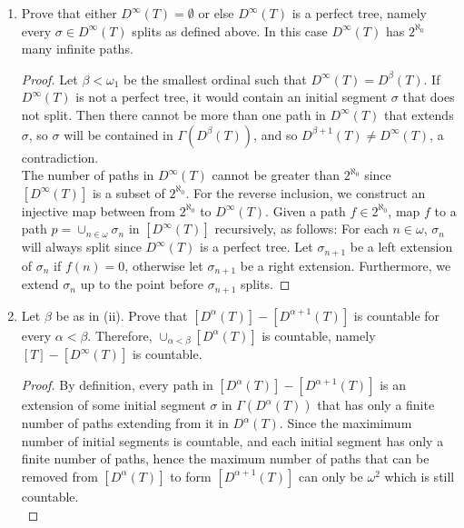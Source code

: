 \documentclass{article}
\begin{document}
\begin{enumerate}[label={\bf Q\arabic*:}]
\begin{enumerate}[label={(\roman*)}]
      \item Prove that either $D^\infty(T)=\emptyset$ or else $D^\infty(T)$
        is a perfect tree, namely every $\sigma\in D^\infty(T)$ splits as
        defined above. In this case $D^\infty(T)$ has $2^{\aleph_0}$ many
        infinite paths.

        \begin{proof}
          Let $\beta<\omega_1$ be the smallest ordinal such that
          $D^\infty(T)=D^\beta(T)$. If $D^\infty(T)$ is not a perfect tree,
          it would contain an initial segment $\sigma$ that does not split.
          Then there cannot be more than one path in $D^\infty(T)$ that
          extends $\sigma$, so $\sigma$ will be contained in
          $\Gamma(D^\beta(T))$, and so $D^{\beta+1}(T)\neq
          D^\infty(T)$, a contradiction. \\

          The number of paths in $D^\infty(T)$ cannot be greater than
          $2^{\aleph_0}$ since $[D^\infty(T)]$ is a subset of
          $2^{\aleph_0}$. For the reverse inclusion, we construct an
          injective map between from $2^{\aleph_0}$ to $D^\infty(T)$. Given
          a path $f\in2^{\aleph_0}$, map $f$ to a path
          $p=\cup_{n\in\omega}\sigma_n$ in $[D^\infty(T)]$ recursively, as
          follows: For each $n\in\omega$, $\sigma_n$ will always split
          since $D^\infty(T)$ is a perfect tree. Let $\sigma_{n+1}$ be a
          left extension of $\sigma_{n}$ if $f(n)=0$, otherwise let
          $\sigma_{n+1}$ be a right extension. Furthermore, we extend
          $\sigma_n$ up to the point before $\sigma_{n+1}$ splits.
        \end{proof}

      \item Let $\beta$ be as in (ii). Prove that
        $[D^\alpha(T)]-[D^{\alpha+1}(T)]$ is countable for every
        $\alpha<\beta$. Therefore, $\cup_{\alpha<\beta}[D^\alpha(T)]$ is
        countable, namely $[T]-[D^\infty(T)]$ is countable.

        \begin{proof}
          By definition, every path in $[D^\alpha(T)]-[D^{\alpha+1}(T)]$ is
          an extension of some initial segment $\sigma$ in
          $\Gamma(D^\alpha(T))$ that has only a finite number of paths
          extending from it in $D^\alpha(T)$. Since the maximimum number of
          initial segments is countable, and each initial segment has only
          a finite number of paths, hence the maximum number of paths that
          can be removed from $[D^\alpha(T)]$ to form $[D^{\alpha+1}(T)]$
          can only be $\omega^2$ which is still countable. \\


\end{proof}
\end{enumerate}
\end{enumerate}
\end{document}
